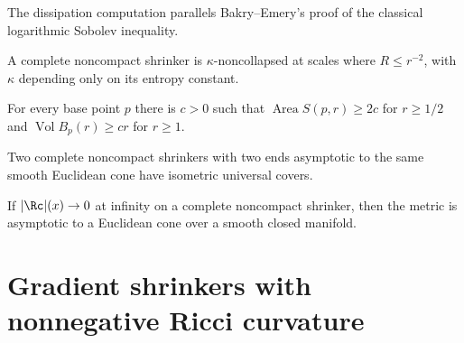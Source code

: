 \begin{remark}
\label{rem:chow-iv-bakry-emery-method}
The dissipation computation parallels Bakry--Emery's proof of the classical
logarithmic Sobolev inequality.
\end{remark}

\begin{corollary}
\label{cor:chow-iv-shrinker-noncollapsing}
A complete noncompact shrinker is $\kappa$-noncollapsed at scales where
$R\le r^{-2}$, with $\kappa$ depending only on its entropy constant.
\end{corollary}

\begin{theorem}
\label{thm:chow-iv-shrinker-linear-growth}
For every base point $p$ there is $c>0$ such that
$\operatorname{Area}S(p,r)\ge2c$ for $r\ge1/2$ and
$\operatorname{Vol}B_p(r)\ge cr$ for $r\ge1$.
\end{theorem}

\begin{theorem}
\label{thm:chow-iv-asymptotic-cone-uniqueness}
Two complete noncompact shrinkers with two ends asymptotic to the same smooth
Euclidean cone have isometric universal covers.
\end{theorem}

\begin{theorem}
\label{thm:chow-iv-asymptotic-cone}
If $|\Rc|(x)\to0$ at infinity on a complete noncompact shrinker, then the
metric is asymptotic to a Euclidean cone over a smooth closed manifold.
\end{theorem}

\section{Gradient shrinkers with nonnegative Ricci curvature}

